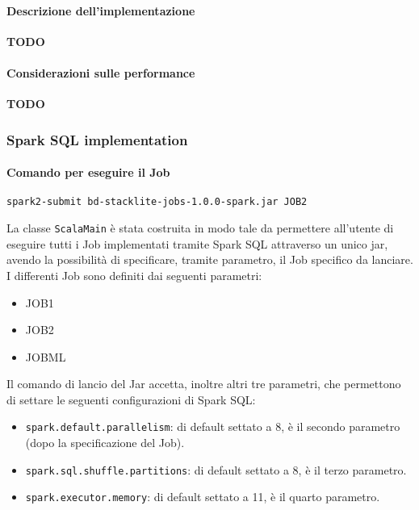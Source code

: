   \paragraph{Descrizione dell'implementazione}\label{par:job2:mapreduce:implementation}

  \textbf{TODO}

  \paragraph{Considerazioni sulle performance}\label{par:job2:mapreduce:performance}

  \textbf{TODO}

  \subsubsection{Spark SQL implementation}\label{subsub:job2:spark}

  \paragraph{Comando per eseguire il Job}\label{par:job2:spark:cmd}

  \texttt{spark2-submit bd-stacklite-jobs-1.0.0-spark.jar JOB2}

  La classe \texttt{ScalaMain} è stata costruita in modo tale da permettere all'utente di eseguire tutti i Job implementati tramite
  Spark SQL attraverso un unico jar, avendo la possibilità di specificare, tramite parametro, il Job specifico da lanciare.
  I differenti Job sono definiti dai seguenti parametri:
  \begin{itemize}
    \item JOB1
    \item JOB2
    \item JOBML
  \end{itemize}

  Il comando di lancio del Jar accetta, inoltre altri tre parametri, che permettono di settare le seguenti configurazioni di Spark SQL\@:
  \begin{itemize}
    \item \texttt{spark.default.parallelism}: di default settato a 8, è il secondo parametro (dopo la specificazione del Job).
    \item \texttt{spark.sql.shuffle.partitions}: di default settato a 8, è il terzo parametro.
    \item \texttt{spark.executor.memory}: di default settato a 11, è il quarto parametro.
  \end{itemize}


